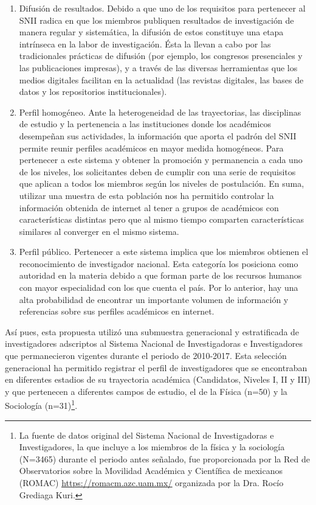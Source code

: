 \documentclass[
  spanish,
  11pt,
  a4paper,
]{scrbook}
\begin{document}
\begin{enumerate}
\def\labelenumi{\arabic{enumi}.}
\item
  Difusión de resultados. Debido a que uno de los requisitos para
  pertenecer al SNII radica en que los miembros publiquen resultados de
  investigación de manera regular y sistemática, la difusión de estos
  constituye una etapa intrínseca en la labor de investigación. Ésta la
  llevan a cabo por las tradicionales prácticas de difusión (por
  ejemplo, los congresos presenciales y las publicaciones impresas), y a
  través de las diversas herramientas que los medios digitales facilitan
  en la actualidad (las revistas digitales, las bases de datos y los
  repositorios institucionales).
\item
  Perfil homogéneo. Ante la heterogeneidad de las trayectorias, las
  disciplinas de estudio y la pertenencia a las instituciones donde los
  académicos desempeñan sus actividades, la información que aporta el
  padrón del SNII permite reunir perfiles académicos en mayor medida
  homogéneos. Para pertenecer a este sistema y obtener la promoción y
  permanencia a cada uno de los niveles, los solicitantes deben de
  cumplir con una serie de requisitos que aplican a todos los miembros
  según los niveles de postulación. En suma, utilizar una muestra de
  esta población nos ha permitido controlar la información obtenida de
  internet al tener a grupos de académicos con características distintas
  pero que al mismo tiempo comparten características similares al
  converger en el mismo sistema.
\item
  Perfil público. Pertenecer a este sistema implica que los miembros
  obtienen el reconocimiento de investigador nacional. Esta categoría
  los posiciona como autoridad en la materia debido a que forman parte
  de los recursos humanos con mayor especialidad con los que cuenta el
  país. Por lo anterior, hay una alta probabilidad de encontrar un
  importante volumen de información y referencias sobre sus perfiles
  académicos en internet.
\end{enumerate}

Así pues, esta propuesta utilizó una submuestra generacional y
estratificada de investigadores adscriptos al Sistema Nacional de
Investigadoras e Investigadores que permanecieron vigentes durante el
periodo de 2010-2017. Esta selección generacional ha permitido registrar
el perfil de investigadores que se encontraban en diferentes estadios de
su trayectoria académica (Candidatos, Niveles I, II y III) y que
pertenecen a diferentes campos de estudio, el de la Física (n=50) y la
Sociología (n=31)\footnote{La fuente de datos original del Sistema
  Nacional de Investigadoras e Investigadores, la que incluye a los
  miembros de la física y la sociología (N=3465) durante el periodo
  antes señalado, fue proporcionada por la Red de Observatorios sobre la
  Movilidad Académica y Científica de mexicanos (ROMAC)
  \href{https://romacm.azc.uam.mx/}{\ul{https://romacm.azc.uam.mx/}}
  organizada por la Dra. Rocío Grediaga Kuri.}.
\end{document}

